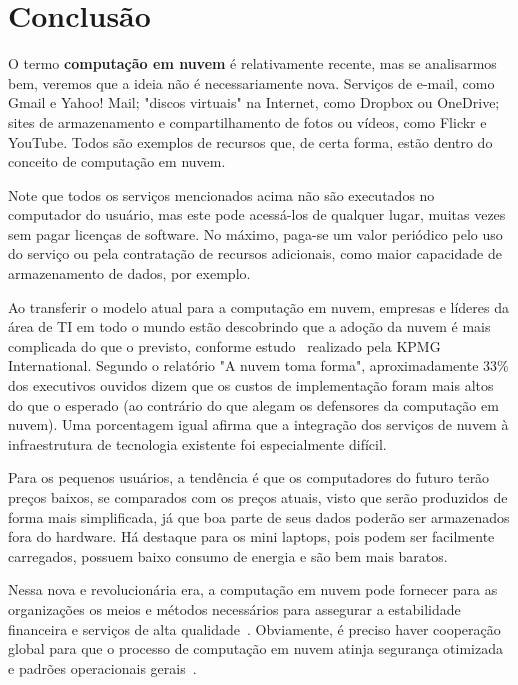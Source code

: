 \section{Conclusão}

O termo \textbf{computação em nuvem} é relativamente recente, mas se analisarmos bem,
veremos que a ideia não é necessariamente nova. Serviços de e-mail, como Gmail e
Yahoo! Mail; "discos virtuais" na Internet, como Dropbox ou OneDrive; sites de
armazenamento e compartilhamento de fotos ou vídeos, como Flickr e YouTube. Todos são
exemplos de recursos que, de certa forma, estão dentro do conceito de computação em
nuvem.

Note que todos os serviços mencionados acima não são executados no computador do
usuário, mas este pode acessá-los de qualquer lugar, muitas vezes sem pagar licenças
de software. No máximo, paga-se um valor periódico pelo uso do serviço ou pela
contratação de recursos adicionais, como maior capacidade de armazenamento de dados,
por exemplo.

Ao transferir o modelo atual para a computação em nuvem, empresas e líderes da área 
de TI em todo o mundo estão descobrindo que a adoção da nuvem é mais complicada do 
que o previsto, conforme estudo~\cite{kmpg-cloud-takes-shape} realizado pela KPMG 
International. Segundo o relatório "A nuvem toma forma", aproximadamente 33\% dos 
executivos ouvidos dizem que os custos de implementação foram mais altos do que o 
esperado (ao contrário do que alegam os defensores da computação em nuvem). Uma 
porcentagem igual afirma que a integração dos serviços de nuvem à infraestrutura de 
tecnologia existente foi especialmente difícil.

Para os pequenos usuários, a tendência é que os computadores do futuro terão preços
baixos, se comparados com os preços atuais, visto que serão produzidos de forma mais
simplificada, já que boa parte de seus dados poderão ser armazenados fora do
hardware. Há destaque para os mini laptops, pois podem ser facilmente carregados,
possuem baixo consumo de energia e são bem mais baratos.

Nessa nova e revolucionária era, a computação em nuvem pode fornecer para as 
organizações os meios e métodos necessários para assegurar a estabilidade financeira 
e serviços de alta qualidade~\cite{cloud-computing-fundamentals}. Obviamente, é 
preciso haver cooperação global para que o processo de computação em nuvem atinja 
segurança otimizada e padrões operacionais 
gerais~\cite{cloud-computing-fundamentals}. 
